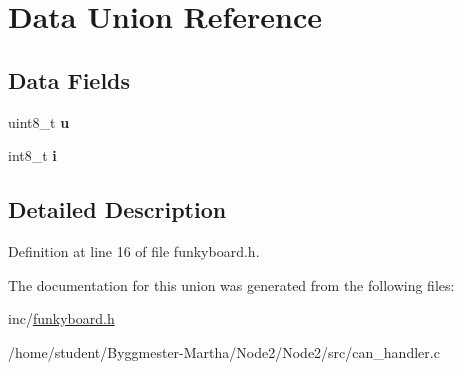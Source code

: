 \hypertarget{unionData}{}\section{Data Union Reference}
\label{unionData}
\subsection*{Data Fields}
\begin{DoxyCompactItemize}
\item 
\mbox{\label{unionData_a6d913633423729c5773303b505873597}} 
uint8\+\_\+t {\bfseries u}
\item 
\mbox{\label{unionData_a611d229e5820bb45c641d1e27be9eaa7}} 
int8\+\_\+t {\bfseries i}
\end{DoxyCompactItemize}


\subsection{Detailed Description}


Definition at line 16 of file funkyboard.\+h.



The documentation for this union was generated from the following files\+:\begin{DoxyCompactItemize}
\item 
inc/\hyperlink{funkyboard_8h}{funkyboard.\+h}\item 
/home/student/\+Byggmester-\/\+Martha/\+Node2/\+Node2/src/can\+\_\+handler.\+c\end{DoxyCompactItemize}
